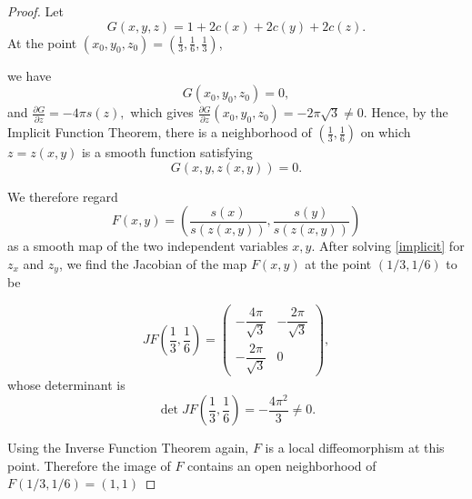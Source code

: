 \documentclass[10pt,a4paper]{amsart}
\begin{document}
\begin{proof}
Let
\[
G(x,y,z)=1+2c(x)+2c(y)+2c(z).
\]
At the point $(x_0,y_0,z_0)=\left(\frac13,\frac16,\frac13\right)$,

we have
\[
G(x_0,y_0,z_0)=0,
\]
and
$\frac{\partial G}{\partial z}=-4\pi s(z),$ which gives $\frac{\partial G}{\partial z}(x_0,y_0,z_0)
=-2\pi\sqrt3\neq0.$ Hence, by the Implicit Function Theorem, there is a neighborhood of
$\left(\frac13,\frac16\right)$ on which $z=z(x,y)$ is a smooth function
satisfying
\begin{equation}\label{implicit}
G(x,y,z(x,y))=0.
\end{equation}

We therefore regard
\[
F(x,y)
=
\left(
\frac{s(x)}{s(z(x,y))},
\frac{s(y)}{s(z(x,y))}
\right)
\]
as a smooth map of the two independent variables $x,y$. After solving \eqref{implicit} for $z_x$ and $z_y$, we find the Jacobian of the map $F(x,y)$ at the point $(1/3,1/6)$ to be







\[
JF\!\left(\frac13,\frac16\right)
=
\begin{pmatrix}
-\dfrac{4\pi}{\sqrt3} & -\dfrac{2\pi}{\sqrt3}\\[1.2ex]
-\dfrac{2\pi}{\sqrt3} & 0
\end{pmatrix},
\]
whose determinant is
\[
\det JF\!\left(\frac13,\frac16\right)
=
-\frac{4\pi^2}{3}\neq0.
\]

 Using the Inverse Function Theorem again,
$F$ is a local diffeomorphism at this point. Therefore the image of $F$ contains an open neighborhood of $F(1/3,1/6)=(1,1)$
\end{proof}
\end{document}
